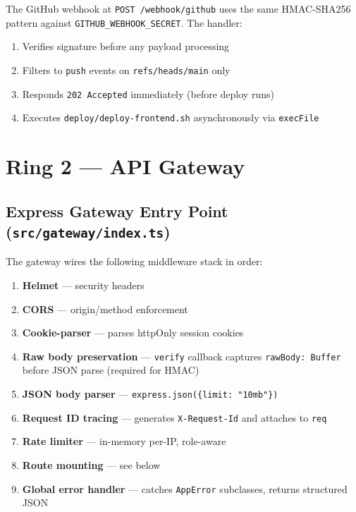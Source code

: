 \documentclass[12pt,a4paper]{article}
\begin{document}
The GitHub webhook at \texttt{POST /webhook/github} uses the same HMAC-SHA256
pattern against \texttt{GITHUB\_WEBHOOK\_SECRET}. The handler:
\begin{enumerate}[noitemsep]
  \item Verifies signature before any payload processing
  \item Filters to \texttt{push} events on \texttt{refs/heads/main} only
  \item Responds \texttt{202 Accepted} immediately (before deploy runs)
  \item Executes \texttt{deploy/deploy-frontend.sh} asynchronously via \texttt{execFile}
\end{enumerate}

\section{Ring 2 — API Gateway}
\label{sec:ring2}

\subsection{Express Gateway Entry Point (\texttt{src/gateway/index.ts})}

The gateway wires the following middleware stack in order:

\begin{enumerate}[noitemsep]
  \item \textbf{Helmet} — security headers
  \item \textbf{CORS} — origin/method enforcement
  \item \textbf{Cookie-parser} — parses httpOnly session cookies
  \item \textbf{Raw body preservation} — \texttt{verify} callback captures \texttt{rawBody: Buffer} before JSON parse (required for HMAC)
  \item \textbf{JSON body parser} — \texttt{express.json(\{limit: "10mb"\})}
  \item \textbf{Request ID tracing} — generates \texttt{X-Request-Id} and attaches to \texttt{req}
  \item \textbf{Rate limiter} — in-memory per-IP, role-aware
  \item \textbf{Route mounting} — see below
  \item \textbf{Global error handler} — catches \texttt{AppError} subclasses, returns structured JSON
\end{enumerate}
\end{document}
